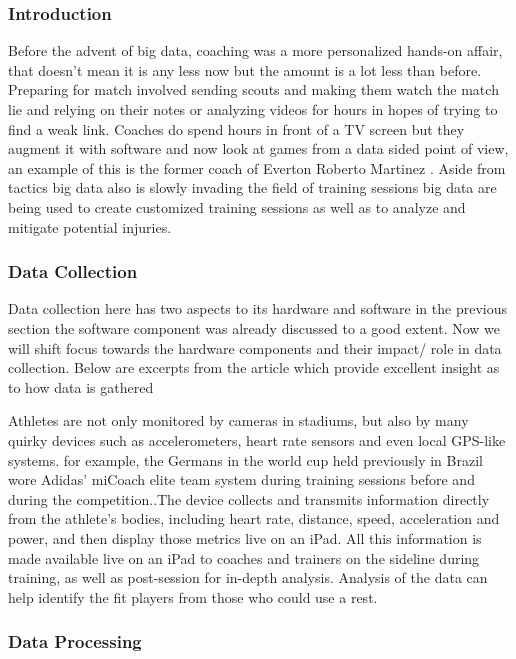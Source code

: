 \documentclass[sigconf]{acmart}
\begin{document}
\subsubsection{Introduction}

Before the advent of big data, coaching was a more personalized hands-on affair, that doesn’t mean it is any less now but the amount is a lot less than before. Preparing for match involved sending scouts and making them watch the match lie and relying on their notes or analyzing videos for hours in hopes of trying to find a weak link. Coaches do spend hours in front of a TV screen but they augment it with software and now look at games from a data sided point of view, an example of this is the former coach of Everton Roberto Martinez \cite{2012}. Aside from tactics big data also is slowly invading the field of training sessions big data are being used to create customized training sessions as well as to analyze and mitigate potential injuries.

\subsubsection{Data Collection}

Data collection here has two aspects to its hardware and software in the previous section the software component was already discussed to a good extent. Now we will shift focus towards the hardware components and their impact/ role in data collection. Below are excerpts from the article \cite{Rejec2000s} which provide excellent insight as to how data is gathered 

Athletes are not only monitored by cameras in stadiums, but also by many quirky devices such as accelerometers, heart rate sensors and even local GPS-like systems. for example, the Germans in the world cup held previously in Brazil wore Adidas’ miCoach elite team system during training sessions before and during the competition.\cite{Rejec2000s}.The device collects and transmits information directly from the athlete’s bodies, including heart rate, distance, speed, acceleration and power, and then display those metrics live on an iPad. All this information is made available live on an iPad to coaches and trainers on the sideline during training, as well as post-session for in-depth analysis. Analysis of the data can help identify the fit players from those who could use a rest.


\subsubsection{Data Processing}
\end{document}

